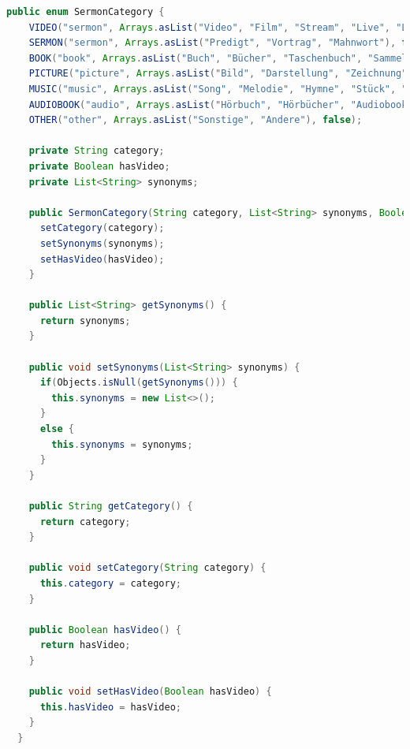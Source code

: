 \begin{lstlisting}[language=Java, title={Enumeration der verschiedenen Kategorien \cite{frontend2022}}]
  public enum SermonCategory {
    VIDEO("sermon", Arrays.asList("Video", "Film", "Stream", "Live", "Livestream"), true),
    SERMON("sermon", Arrays.asList("Predigt", "Vortrag", "Mahnwort"), false),
    BOOK("book", Arrays.asList("Buch", "Bücher", "Taschenbuch", "Sammelband", "Reader", "Druck", "Bestseller"), false),
    PICTURE("picture", Arrays.asList("Bild", "Darstellung", "Zeichnung", "Aufnahme", "Foto", "Fotografie"), false),
    MUSIC("music", Arrays.asList("Song", "Melodie", "Hymne", "Stück", "Gesang", "Klavier", "Musik", "Orchester"), false),
    AUDIOBOOK("audio", Arrays.asList("Hörbuch", "Hörbücher", "Audiobook"), false),
    OTHER("other", Arrays.asList("Sonstige", "Andere"), false);

    private String category;
    private Boolean hasVideo;
    private List<String> synonyms;

    public SermonCategory(String category, List<String> synonyms, Boolean hasVideo) {
      setCategory(category);
      setSynonyms(synonyms);
      setHasVideo(hasVideo);
    }

    public List<String> getSynonyms() {
      return synonyms;
    }

    public void setSynonyms(List<String> synonyms) {
      if(Objects.isNull(getSynonyms())) {
        this.synonyms = new List<>();
      }
      else {
        this.synonyms = synonyms;
      }
    }

    public String getCategory() {
      return category;
    }

    public void setCategory(String category) {
      this.category = category;
    }

    public Boolean hasVideo() {
      return hasVideo;
    }

    public void setHasVideo(Boolean hasVideo) {
      this.hasVideo = hasVideo;
    }
  }
\end{lstlisting}
\label{code:SermonCategory}



